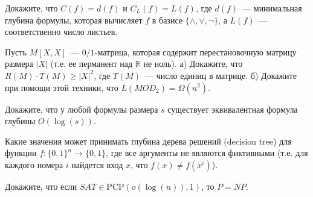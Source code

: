 \begin{task}
    Докажите, что $C(f) = d(f)$ и $C_L(f) = L(f)$, где $d(f)$~--- минимальная глубина формулы, которая вычисляет $f$ в базисе
    $\{\land, \lor, \neg\}$, а $L(f)$~--- соответственно число листьев.
\end{task}

\begin{task}
    Пусть $M[X, X]$~--- $0 / 1$-матрица, которая содержит перестановочную матрицу размера $|X|$ (т.е. ее перманент над
    $\mathbb{R}$ не ноль). а) Докажите, что $R(M) \cdot T(M) \ge |X|^2$, где $T(M)$~--- число единиц в матрице. б) Докажите при
    помощи этой техники, что $L(MOD_2) = \Omega(n^2)$.
\end{task}


\breakline

\begin{ptask}{9}
    Докажите, что у любой формулы размера $s$ существует эквивалентная формула глубины $O(\log(s))$.
\end{ptask}

\begin{ptask}{10}
    Какие значения может принимать глубина дерева решений (decision tree) для функции $f: \{0, 1\}^n \rightarrow \{0, 1\}$, где
    все аргументы не являются фиктивными (т.е. для каждого номера $i$ найдется вход $x$, что $f(x) \neq f(x^{i})$).
\end{ptask}

\begin{ptask}{14}
    Докажите, что если $SAT \in \mathrm{PCP}(o(\log(n)), 1)$, то $P = NP$.
\end{ptask}

